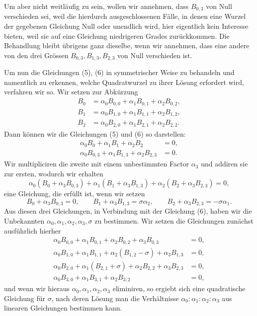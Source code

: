 \documentclass[11pt]{article}
\begin{document}
Um aber nicht weitläufig zu sein, wollen wir annehmen, dass $B_{0,3}$ von Null verschieden sei, weil die hierdurch ausgeschlossenen Fälle, in denen eine Wurzel der gegebenen Gleichung Null oder unendlich wird, hier eigentlich kein Interesse bieten, weil sie auf eine Gleichung niedrigeren Grades zurückkommen. Die Behandlung bleibt übrigens ganz dieselbe, wenn wir annehmen, dass eine andere von den drei Grössen $B_{0,3},B_{1,3},B_{2,3}$ von Null verschieden ist.

Um nun die Gleichungen (5), (6) in symmetrischer Weise zu behandeln und namentlich zu erkennen, welche Quadratwurzel zu ihrer Lösung erfordert wird, verfahren wir so. Wir setzen zur Abkürzung
\begin{equation}
\begin{aligned}
B_0&=\alpha_0B_{0,0}+\alpha_1B_{0,1}+\alpha_2B_{0,2},\\
B_1&=\alpha_0B_{1,0}+\alpha_1B_{1,1}+\alpha_2B_{1,2},\\
B_2&=\alpha_0B_{2,0}+\alpha_1B_{2,1}+\alpha_2B_{2,2}.
\end{aligned}
\tag{7}
\end{equation}
Dann können wir die Gleichungen (5) und (6) so darstellen:
\begin{equation}
\begin{aligned}
\alpha_0B_0+\alpha_1B_1+\alpha_2B_2&=0,\\
\alpha_0B_{0,3}+\alpha_1B_{1,3}+\alpha_2B_{2,3}&=0.
\end{aligned}
\tag{8}
\end{equation}
Wir multipliciren die zweite mit einem unbestimmten Factor $\alpha_3$ und addiren sie zur ersten, wodurch wir erhalten
\begin{equation}
 \alpha_0(B_0+\alpha_3B_{0,3})+
 \alpha_1(B_1+\alpha_3B_{1,3})+
 \alpha_2(B_2+\alpha_3B_{2,3})=0,
\tag{9}
\end{equation}
eine Gleichung, die erfüllt ist, wenn wir setzen
\begin{equation}
 B_0+\alpha_3B_{0,3}=0,
 \qquad B_1+\alpha_3B_{1,3}=\sigma\alpha_2,
 \qquad B_2+\alpha_3B_{2,3}=-\sigma\alpha_1.
\tag{10}
\end{equation}
Aus diesen drei Gleichungen, in Verbindung mit der Gleichung (6), haben wir die Unbekannten $\alpha_0,\alpha_1,\alpha_2,\alpha_3,\sigma$ zu bestimmen. Wir setzen die Gleichungen zunächst ausführlich hierher
\begin{equation}
\begin{aligned}
\alpha_0B_{0,0}+\alpha_1B_{0,1}+\alpha_2B_{0,2}+\alpha_3B_{0,3}&=0,\\
\alpha_0B_{1,0}+\alpha_1B_{1,1}+\alpha_2(B_{1,2}-\sigma)+\alpha_3B_{1,3}&=0,\\
\alpha_0B_{2,0}+\alpha_1(B_{2,1}+\sigma)+\alpha_2B_{2,2}+\alpha_3B_{2,3}&=0,\\
\alpha_0B_{3,0}+\alpha_1B_{3,1}+\alpha_2B_{3,2}&=0,
\end{aligned}
\tag{11}
\end{equation}
und wenn wir hieraus $\alpha_0,\alpha_1,\alpha_2,\alpha_3$ eliminiren, so ergiebt sich eine quadratische Gleichung für $\sigma$, nach deren Lösung man die Verhältnisse $\alpha_0:\alpha_1:\alpha_2:\alpha_3$ aus linearen Gleichungen bestimmen kann.
\end{document}
